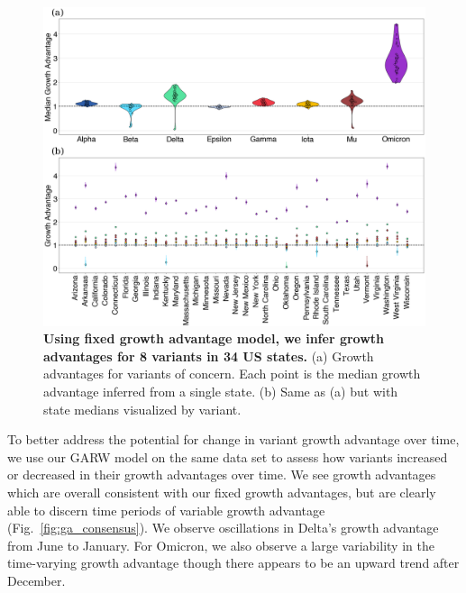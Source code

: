 \documentclass[11pt,oneside,letterpaper]{article}
\begin{document}
\begin{figure}[h!]
  \centering
  \includegraphics[width=\linewidth]{figs/growth_advantages.png}
  \caption{\textbf{Using fixed growth advantage model, we infer growth advantages for 8 variants in 34 US states.}
  (a) Growth advantages for variants of concern. Each point is the median growth advantage inferred from a single state.
  (b) Same as (a) but with state medians visualized by variant.}
  \label{fig:growth_advantages}
\end{figure}

To better address the potential for change in variant growth advantage over time, we use our GARW model on the same data set to assess how variants increased or decreased in their growth advantages over time.
We see growth advantages which are overall consistent with our fixed growth advantages, but are clearly able to discern time periods of variable growth advantage (Fig.\ \ref{fig:ga_consensus}).
We observe oscillations in Delta's growth advantage from June to January.
For Omicron, we also observe a large variability in the time-varying growth advantage though there appears to be an upward trend after December.
\end{document}
